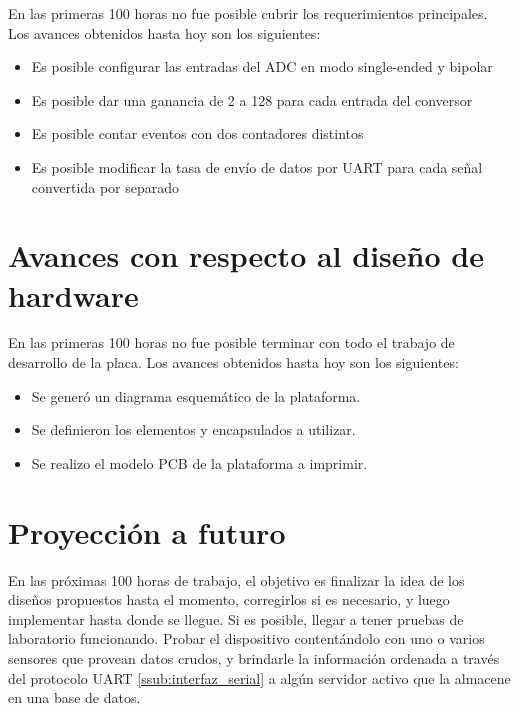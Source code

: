 \documentclass{article}
\theoremstyle{definition}
\theoremstyle{remark}
\begin{document}
En las primeras 100 horas no fue posible cubrir los requerimientos principales. Los avances obtenidos hasta hoy son los siguientes:

\begin{itemize}
  \item Es posible configurar las entradas del ADC en modo single-ended y bipolar
  \item Es posible dar una ganancia de 2 a 128 para cada entrada del conversor
  \item Es posible contar eventos con dos contadores distintos
  \item Es posible modificar la tasa de envío de datos por UART para cada señal convertida por separado
\end{itemize}


\section{Avances con respecto al diseño de hardware} %
\label{sec:avances_con_respecto_al_diseno_de_hardware}

En las primeras 100 horas no fue posible terminar con todo el trabajo de desarrollo de la placa. Los avances obtenidos hasta hoy son los siguientes:

\begin{itemize}
    \item Se generó un diagrama esquemático de la plataforma.
    \item Se definieron los elementos y encapsulados a utilizar.
    \item Se realizo el modelo PCB de la plataforma a imprimir.
\end{itemize}



\section{Proyección a futuro} %
\label{sec:proyeccion_a_futuro}

En las próximas 100 horas de trabajo, el objetivo es finalizar la idea de los diseños propuestos hasta el momento, corregirlos si es necesario, y luego implementar hasta donde se llegue. Si es posible, llegar a tener pruebas de laboratorio funcionando. Probar el dispositivo contentándolo con uno o varios sensores que provean datos crudos, y brindarle la información ordenada a través del protocolo UART \ref{ssub:interfaz_serial} a algún servidor activo que la almacene en una base de datos.
\end{document}
